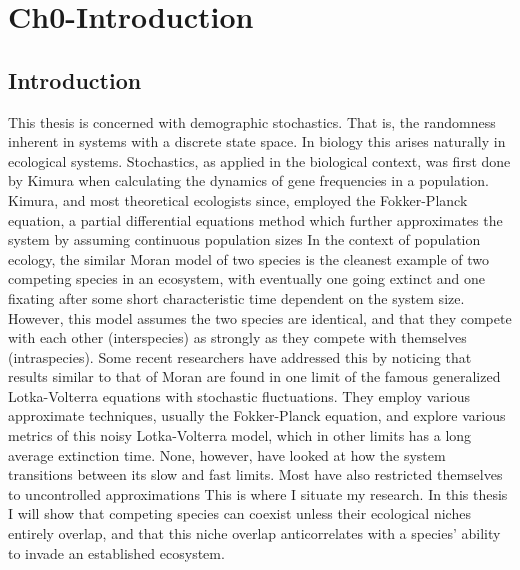 \chapter{Ch0-Introduction}

\section{Introduction}

This thesis is concerned with demographic stochastics. That is, the randomness inherent in systems with a discrete state space. 
In biology this arises naturally in ecological systems. 
Stochastics, as applied in the biological context, was first done by Kimura when calculating the dynamics of gene frequencies in a population. %
Kimura, and most theoretical ecologists since, employed the Fokker-Planck equation, a partial differential equations method which further approximates the system by assuming continuous population sizes %
In the context of population ecology, the similar Moran model of two species is the cleanest example of two competing species in an ecosystem, with eventually one going extinct and one fixating after some short characteristic time dependent on the system size. 
However, this model assumes the two species are identical, and that they compete with each other (interspecies) as strongly as they compete with themselves (intraspecies). 
Some recent researchers have addressed this by noticing that results similar to that of Moran are found in one limit of the famous generalized Lotka-Volterra equations with stochastic fluctuations. 
They employ various approximate techniques, usually the Fokker-Planck equation, and explore various metrics of this noisy Lotka-Volterra model, which in other limits has a long average extinction time. 
None, however, have looked at how the system transitions between its slow and fast limits. 
Most have also restricted themselves to uncontrolled approximations
This is where I situate my research. 
In this thesis I will show that competing species can coexist unless their ecological niches entirely overlap, and that this niche overlap anticorrelates with a species' ability to invade an established ecosystem. 
